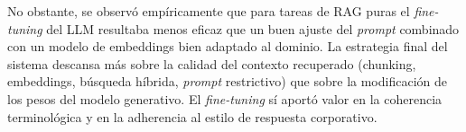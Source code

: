 No obstante, se observó empíricamente que para tareas de RAG puras el \textit{fine-tuning} del LLM resultaba menos eficaz que un buen ajuste del \textit{prompt} combinado con un modelo de embeddings bien adaptado al dominio. La estrategia final del sistema descansa más sobre la calidad del contexto recuperado (chunking, embeddings, búsqueda híbrida, \textit{prompt} restrictivo) que sobre la modificación de los pesos del modelo generativo. El \textit{fine-tuning} sí aportó valor en la coherencia terminológica y en la adherencia al estilo de respuesta corporativo.
